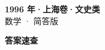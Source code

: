 \documentclass[zihao=-4, a4paper]{ctexart}
\begin{document}
\begin{center}
  {\Large\bfseries 1996 年·上海卷·文史类}\\[4pt]
  {\large 数学 · 简答版}
\end{center}
\medskip
{}

\clearpage
{}
\begin{center}{\Large\bfseries 答案速查}\end{center}
\medskip

\end{document}
